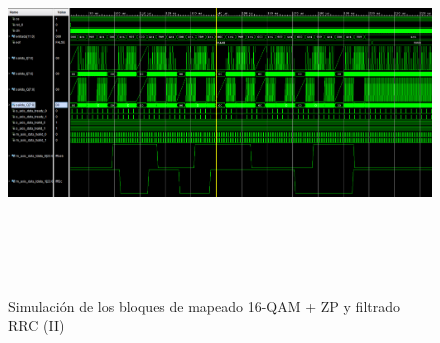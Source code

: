 \begin{figure}[h]
	\centering
	\includegraphics[width=1\textwidth,height=10cm]{img/simu/rrc2.PNG}
	\caption{Simulación de los bloques de mapeado 16-QAM + ZP y filtrado RRC (II)}
	\label{fig:rrc2}
\end{figure}

\vspace{3mm}